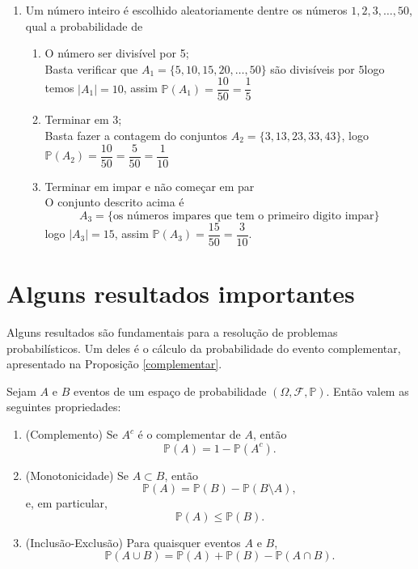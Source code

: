\begin{enumerate}
\begin{enumerate}
		\end{enumerate}
	 \item[(iii)] Um número inteiro é escolhido aleatoriamente dentre os números $1,2,3,\dots,50$, qual a probabilidade de
	\begin{enumerate}
		\item [(a)] O número ser divisível por 5;\\
		Basta verificar que $A_1 = \{5,10,15,20,\dots,50\}$ são divisíveis por $5$logo temos $|A_1| = 10$, assim $\mathbb{P}(A_1) = \dfrac{10}{50} = \dfrac{1}{5}$
		\item [(b)] Terminar em 3;\\
		Basta fazer a contagem do conjuntos $A_2 = \{3,13,23,33,43\}$, logo $\mathbb{P}(A_2) = \dfrac{10}{50} = \dfrac{5}{50} = \dfrac{1}{10}$
		\item [(c)] Terminar em impar e não começar em par\\
		O conjunto descrito acima é
		$$A_3 = \{\text{os números impares que tem o primeiro digito impar}\}$$ 
		logo $|A_3|= 15$, assim $\mathbb{P}(A_3) = \dfrac{15}{50}= \dfrac{3}{10}$.
 	\end{enumerate}
 	\end{enumerate}
\section{Alguns resultados importantes}

Alguns resultados são fundamentais para a resolução de problemas probabilísticos. Um deles é o cálculo da probabilidade do evento complementar, apresentado na Proposição \ref{complementar}.
 \begin{prop}
Sejam $A$ e $B$ eventos de um espaço de probabilidade $(\Omega,\mathcal{F},\mathbb{P})$. Então valem as seguintes propriedades:

\begin{enumerate}
    \item[(i)] (Complemento) Se $A^c$ é o complementar de $A$, então
    \begin{equation}
        \mathbb{P}(A) = 1 - \mathbb{P}(A^c).
    \end{equation}

    \item[(ii)] (Monotonicidade) Se $A \subset B$, então
    \begin{equation}
        \mathbb{P}(A) = \mathbb{P}(B) - \mathbb{P}(B \setminus A),
    \end{equation}
    e, em particular,
    \begin{equation}
        \mathbb{P}(A) \leq \mathbb{P}(B).
    \end{equation}

    \item[(iii)] (Inclusão-Exclusão) Para quaisquer eventos $A$ e $B$,
    \begin{equation}
        \mathbb{P}(A \cup B) = \mathbb{P}(A) + \mathbb{P}(B) - \mathbb{P}(A \cap B).
    \end{equation}
\end{enumerate}
\end{prop}

